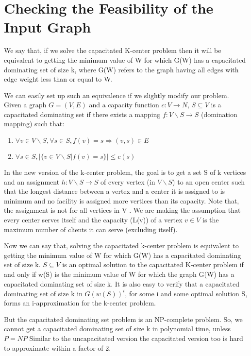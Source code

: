 \documentclass[12pt,a4paper,onecolumn]{article}
\begin{document}
\section{Checking the Feasibility of the Input Graph}
We say that, if we solve the capacitated K-center problem then it will be equivalent to getting the minimum value of W for which G(W) has a capacitated dominating set of size k, where G(W) refers to the graph having all edges with edge weight less than or equal to W.

We can easily set up such an equivalence if we slightly modify our problem. Given a graph $G = (V,E)$ and a capacity function $c : V \rightarrow N$, $S \subseteq V$ is a capacitated dominating set if there exists a mapping $f : V \backslash S \rightarrow S$ (domination mapping) such that:\begin{enumerate}

\item $\forall v \in V \backslash S,\forall s \in S,f(v) = s \Longrightarrow (v,s) \in E$\\ \item $\forall s \in S,| \{ v \in V \backslash S | f(v) = s \} | \leq c(s)$
\end{enumerate}In the new version of the k-center problem, the goal is to get a set S of k vertices and an assignment $h : V \backslash S \rightarrow S$ of every vertex (in $V \backslash S$) to an open center such that the longest distance between a vertex and a center it is assigned to is minimum and no facility is assigned more vertices than its capacity. Note that, the assignment is not for all vertices in V . We are making the assumption that every center serves itself and the capacity (L(v)) of a vertex $v \in V$ is the maximum number of clients it can serve (excluding itself). 

Now we can say that, solving the capacitated k-center problem is equivalent to getting the minimum value of W for which G(W) has a capacitated dominating set of size k. 
$S \subseteq V$ is an optimal solution to the capacitated K-center problem if and only if w(S) is the minimum value of W for which the graph G(W) has a capacitated dominating set of size k.
It is also easy to verify that a capacitated dominating set of size k in $G(w(S))^i$, for some i and some optimal solution S, forms an i-approximation for the k-center problem.

But the capacitated dominating set problem is an NP-complete problem. So, we cannot get a capacitated dominating set of size k in polynomial time, unless $P = NP$ Similar to the uncapacitated version the capacitated version too is hard to approximate within a factor of 2.
\end{document}
